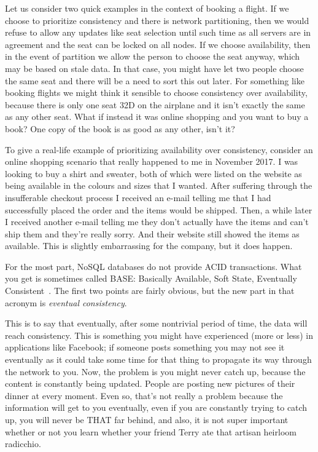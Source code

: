 \documentclass[a4paper]{report}
\begin{document}
Let us consider two quick examples in the context of booking a flight. If we choose to prioritize consistency and there is network partitioning, then we would refuse to allow any updates like seat selection until such time as all servers are in agreement and the seat can be locked on all nodes. If we choose availability, then in the event of partition we allow the person to choose the seat anyway, which may be based on stale data. In that case, you might have let two people choose the same seat and there will be a need to sort this out later. For something like booking flights we might think it sensible to choose consistency over availability, because there is only one seat 32D on the airplane and it isn't exactly the same as any other seat. What if instead it was online shopping and you want to buy a book? One copy of the book is as good as any other, isn't it?

To give a real-life example of prioritizing availability over consistency, consider an online shopping scenario that really happened to me in November 2017. I was looking to buy a shirt and sweater, both of which were listed on the website as being available in the colours and sizes that I wanted. After suffering through the insufferable checkout process I received an e-mail telling me that I had successfully placed the order and the items would be shipped. Then, a while later I received another e-mail telling me they don't actually have the items and can't ship them and they're really sorry. And their website still showed the items as available. This is slightly embarrassing for the company, but it does happen.

For the most part, NoSQL databases do not provide ACID transactions. What you get is sometimes called BASE: Basically Available, Soft State, Eventually Consistent~\cite{oraclenosql}.  The first two points are fairly obvious, but the new part in that acronym is \textit{eventual consistency}.

This is to say that eventually, after some nontrivial period of time, the data will reach consistency. This is something you might have experienced (more or less) in applications like Facebook; if someone posts something you may not see it eventually as it could take some time for that thing to propagate its way through the network to you. Now, the problem is you might never catch up, because the content is constantly being updated. People are posting new pictures of their dinner at every moment. Even so, that's not really a problem because the information will get to you eventually, even if you are constantly trying to catch up, you will never be THAT far behind, and also, it is not super important whether or not you learn whether your friend Terry ate that artisan heirloom radicchio.
\end{document}
